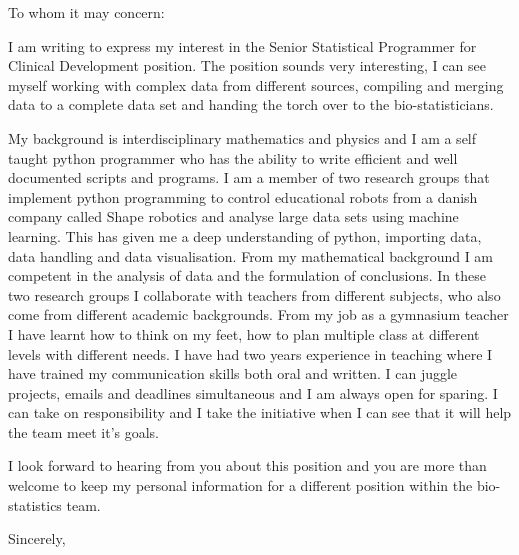\documentclass[10pt,a4paper]{letter}
\begin{document}
\begin{letter}{}
\opening{To whom it may concern:}

I am writing to express my interest in the Senior Statistical Programmer for Clinical Development position. The position sounds very interesting, I can see myself working with complex data from different sources, compiling and merging data to a complete data set and handing the torch over to the bio-statisticians.

My background is interdisciplinary mathematics and physics and I am a self taught python programmer who has the ability to write efficient and well documented scripts and programs. I am a member of two research groups that implement python programming to control educational robots from a danish company called Shape robotics and analyse large data sets using machine learning. This has given me a deep understanding of python, importing data, data handling and data visualisation. From my mathematical background I am competent in the analysis of data and the formulation of conclusions. In these two research groups I collaborate with teachers from different subjects, who also come from different academic backgrounds. From my job as a gymnasium teacher I have learnt how to think on my feet, how to plan multiple class at different levels with different needs. I have had two years experience in teaching where I have trained my communication skills both oral and written. I can juggle projects, emails and deadlines simultaneous and I am always open for sparing. I can take on responsibility and I take the initiative when I can see that it will help the team meet it's goals.             


I look forward to hearing from you about this position and you are more than welcome to keep my personal information for a different position within the bio-statistics team.   

\closing{Sincerely,}

\end{letter}
\end{document}
